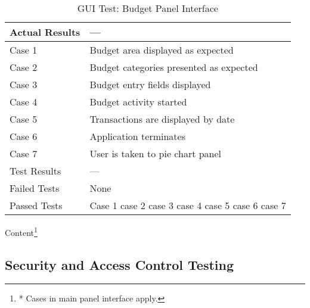 \documentclass{article}
\begin{document}
\begin{table}[htbp]
\begin{center}
\begin{tabular}{|l | l|}
Actual Results & ---\\
\hline
Case 1 & Budget area displayed as expected  \\
 \hline
Case 2 & Budget categories presented as expected  \\
\hline
Case 3 &  Budget entry fields displayed  \\
\hline
 Case 4 &  Budget activity started \\
\hline
Case 5 &  Transactions are displayed by date  \\
\hline
Case 6 &  Application terminates \\
\hline
Case 7 &  User is taken to pie chart panel  \\
\hline
Test Results & ---\\
\hline
Failed Tests & None\\
\hline
Passed Tests & Case 1 case 2 case 3 case 4 case 5 case 6 case 7\\
\hline


\end{tabular}
\end{center}

\caption{GUI Test: Budget Panel Interface}
Content\footnote{* Cases in main panel interface apply.}
\end{table}
\label{table:}




\clearpage


\subsection{Security and Access Control Testing}
\end{document}
